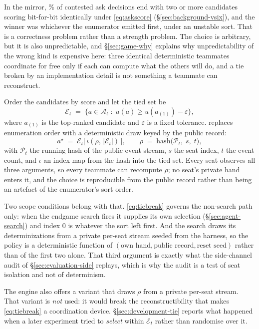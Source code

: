 In the \vsix{} mirror, \vsevenTieContested\% of contested ask decisions end with two or more
candidates scoring bit-for-bit identically under \eqref{eq:askscore}
(\S\ref{sec:background-vsix}), and the winner was whichever the enumerator emitted first, under an
unstable sort. That is a correctness problem rather than a strength problem. The choice is arbitrary,
but it is also unpredictable, and \S\ref{sec:game-why} explains why unpredictability of the wrong kind
is expensive here: three identical deterministic teammates coordinate for free only if each can
compute what the others will do, and a tie broken by an implementation detail is not something a
teammate can reconstruct.

Order the candidates by score and let the tied set be
\begin{equation}
  \mathcal{E}_t \;=\; \bigl\{a \in \mathcal{A}_t \;:\; u(a) \ge u(a_{(1)}) - \varepsilon \bigr\},
  \label{eq:tieset}
\end{equation}
where $a_{(1)}$ is the top-ranked candidate and $\varepsilon$ is a fixed tolerance. \sestina{}
replaces enumeration order with a deterministic draw keyed by the public record:
\begin{equation}
  a^\star \;=\; \mathcal{E}_t\bigl[\,\iota(\rho,\,|\mathcal{E}_t|)\,\bigr],
  \qquad
  \rho \;=\; \mathrm{hash}\bigl(\mathcal{P}_t,\; s,\; t\bigr),
  \label{eq:tiebreak}
\end{equation}
with $\mathcal{P}_t$ the running hash of the public event stream, $s$ the seat index, $t$ the event
count, and $\iota$ an index map from the hash into the tied set. Every seat observes all three arguments, so every teammate can recompute $\rho$; no seat's private
hand enters it, and the choice is reproducible from the public record rather than being an artefact
of the enumerator's sort order.

Two scope conditions belong with that. \eqref{eq:tiebreak} governs the non-search path only: when
the endgame search fires it supplies its own selection (\S\ref{sec:agent-search}) and index $0$ is
whatever the sort left first. And the search draws its determinizations from a private per-seat
stream seeded from the harness, so the policy is a deterministic function of
$(\text{own hand}, \text{public record}, \text{reset seed})$ rather than of the first two alone. That
third argument is exactly what the side-channel audit of \S\ref{sec:evaluation-side} replays, which
is why the audit is a test of seat isolation and not of determinism.

The engine also offers a variant that draws $\rho$ from a private per-seat stream. That variant is
\emph{not} used: it would break the reconstructibility that makes \eqref{eq:tiebreak} a coordination
device. \S\ref{sec:development-tie} reports what happened when a later experiment tried to
\emph{select} within $\mathcal{E}_t$ rather than randomise over it.

